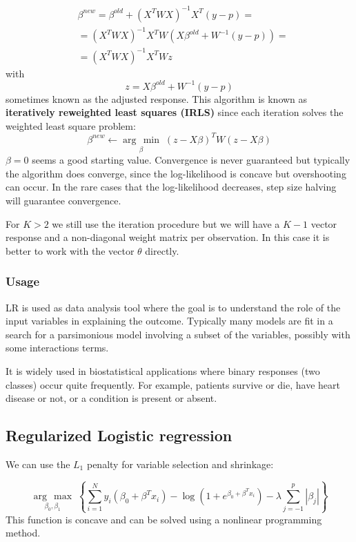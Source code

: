 \documentclass[12pt, letterpaper]{article}
\theoremstyle{definition}
\newcommand{\argmax}[1]{\underset{#1}{\operatorname{arg}\,\operatorname{max}}\;}
\newcommand{\argmin}[1]{\underset{#1}{\operatorname{arg}\,\operatorname{min}}\;}
\begin{document}
\begin{equation}
\begin{aligned}
&\beta^{new} = \beta^{old} +(X^TWX)^{-1}X^T(y-p) = \\
&=(X^TWX)^{-1}X^TW\left(X\beta^{old}+W^{-1} \left(y-p\right)\right) =\\
&= \left(X^TWX\right)^{-1} X^TWz
\end{aligned}
\end{equation}
with
\begin{equation}
z = X\beta^{old}+ W^{-1} (y-p)
\end{equation}
sometimes known as the adjusted response. This algorithm is known as \textbf{iteratively reweighted least squares (IRLS)} since each iteration solves the weighted least square problem:
\begin{equation}
\beta^{new} \leftarrow \argmin{\beta}{\left(z-X\beta\right)^TW\left(z-X\beta\right)}
\end{equation}
$\beta=0$ seems a good starting value. Convergence is never guaranteed but typically the algorithm does converge, since the log-likelihood is concave but overshooting can occur. In the rare cases that the log-likelihood decreases, step size halving will guarantee convergence.

For $K>2$ we still use the iteration procedure but we will have a $K-1$ vector response and a non-diagonal weight matrix per observation. In this case it is better to work with the vector $\theta$ directly.

\subsubsection{Usage}
LR is used as data analysis tool where the goal is to  understand the role of the input variables in explaining the outcome. Typically many models are fit in a search for a parsimonious model involving a subset of the variables, possibly with some interactions terms. 

It is widely used in biostatistical applications where binary responses (two classes) occur quite frequently. For example, patients survive or die, have heart disease or not, or a condition is present or absent.
\subsection{Regularized Logistic regression}
We can use the $L_1$ penalty for variable selection and shrinkage:

\begin{equation}
\argmax{\beta_0,\beta_1} \left\lbrace \sum_{i=1}^N y_i\left(  \beta_0 + \beta^Tx_i\right) -\log \left( 1+e^{\beta_0 + \beta^T x_i}\right) -\lambda \sum_{j=-1}^p |\beta_j|\right\rbrace
\end{equation}
This function is concave and can be solved using a nonlinear programming method.
\end{document}
